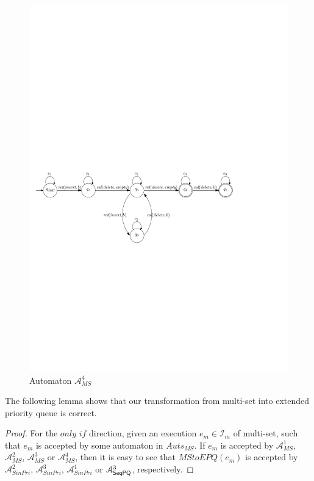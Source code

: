 {\begin{figure}[htbp]
  \centering
  \includegraphics[width=0.8 \textwidth]{figures/PIC_AUTO_MS_4.pdf}
  \caption{Automaton $\mathcal{A}_{\textit{MS}}^4$}
  \label{fig:automata 4 for MS-3 in appendix}
\end{figure}

The following lemma shows that our transformation from multi-set into extended priority queue is correct.

\RelateMultiSetwithEPQ*

\begin {proof}

For the $\textit{only if}$ direction, given an execution $e_m \in \mathcal{I}_m$ of multi-set, such that $e_m$ is accepted by some automaton in $\textit{Auts}_{\textit{MS}}$. If $e_m$ is accepted by $\mathcal{A}_{\textit{MS}}^1$, $\mathcal{A}_{\textit{MS}}^2$, $\mathcal{A}_{\textit{MS}}^3$ or $\mathcal{A}_{\textit{MS}}^4$, then it is easy to see that $\textit{MStoEPQ}(e_m)$ is accepted by $\mathcal{A}_{\textit{SinPri}}^2$, $\mathcal{A}_{\textit{SinPri}}^3$, $\mathcal{A}_{\textit{SinPri}}^1$ or $\mathcal{A}_{\mathsf{SeqPQ}}^3$, respectively.


\end{proof}}
